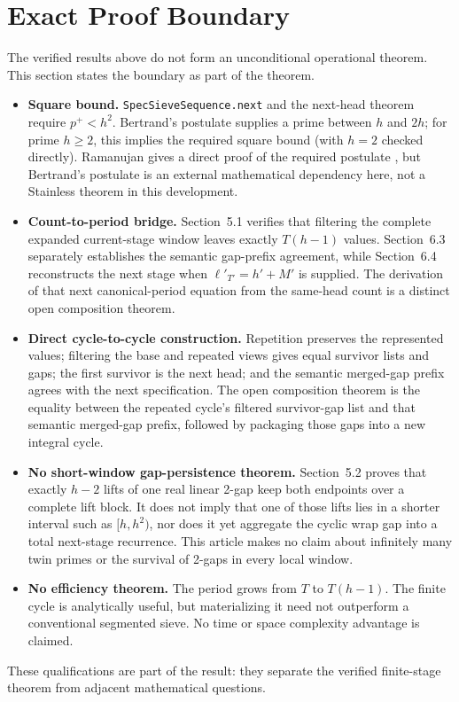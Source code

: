 \section{Exact Proof Boundary}
\label{sec:exact-proof-boundary}

The verified results above do not form an unconditional operational
theorem. This section states the boundary as part of the theorem.

\begin{itemize}
  \item \textbf{Square bound.} \texttt{SpecSieveSequence.next} and the
    next-head theorem require $p^+\lt h^2$. Bertrand's postulate
    supplies a prime between $h$ and $2h$; for prime $h\ge2$, this
    implies the required square bound (with $h=2$ checked directly).
    Ramanujan gives a direct proof of the required postulate
    \cite{ramanujan1919}, but Bertrand's postulate is an external
    mathematical dependency here, not a Stainless theorem in this
    development.

  \item \textbf{Count-to-period bridge.} Section~5.1 verifies that
    filtering the complete expanded current-stage window leaves exactly
    $T(h-1)$ values. Section~6.3 separately establishes the semantic
    gap-prefix agreement, while Section~6.4 reconstructs the next stage
    when $\ell'_{T'}=h'+M'$ is supplied. The derivation of that next
    canonical-period equation from the same-head count is a distinct
    open composition theorem.

  \item \textbf{Direct cycle-to-cycle construction.} Repetition
    preserves the represented values; filtering the base and repeated
    views gives equal survivor lists and gaps; the first survivor is the
    next head; and the semantic merged-gap prefix agrees with the next
    specification. The open composition theorem is the equality between
    the repeated cycle's filtered survivor-gap list and that semantic
    merged-gap prefix, followed by packaging those gaps into a new
    integral cycle.

  \item \textbf{No short-window gap-persistence theorem.} Section~5.2
    proves that exactly $h-2$ lifts of one real linear 2-gap keep both
    endpoints over a complete lift block. It does not imply that one of
    those lifts lies in a shorter interval such as $[h,h^2)$, nor does
    it yet aggregate the cyclic wrap gap into a total next-stage
    recurrence. This article makes no claim about infinitely many twin
    primes or the survival of 2-gaps in every local window.

  \item \textbf{No efficiency theorem.} The period grows from $T$ to
    $T(h-1)$. The finite cycle is analytically useful, but materializing
    it need not outperform a conventional segmented sieve. No time or
    space complexity advantage is claimed.
\end{itemize}

These qualifications are part of the result: they separate the verified
finite-stage theorem from adjacent mathematical questions.
